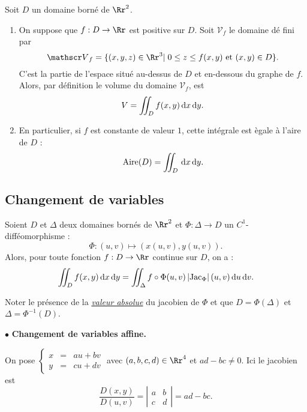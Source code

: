\documentclass[class=report,crop=false]{standalone}
\begin{document}
\vskip6mm

Soit $D$ un domaine borné de $\Rr^2$.
\begin{enumerate}
\item On suppose que $f:D\to \Rr$ est positive sur $D$. Soit ${\mathscr V}_f$ le domaine dé fini par
$${\mathscr V}_f=\{(x,y,z)\in \Rr^3|\; 0\leq z\leq f(x,y)\mbox{ et }(x,y)\in D\}.$$
C'est la partie de l'espace situé au-dessus de $D$ et en-dessous du graphe de $f$. Alors, par définition le volume du domaine ${\mathscr V}_f$, est
$$V=\int \!\!\!\!\int _Df(x,y)\,\mathrm{d} x\,\mathrm{d} y.$$
\item En particulier, si $f$ est constante de valeur $1$, cette intégrale est ègale à l'aire de $D$ :
$${\rm Aire}(D)=\int \!\!\!\!\int _D\,\mathrm{d} x\,\mathrm{d} y.$$
\end{enumerate}

\vskip8mm

\subsection{Changement de variables}

\vskip4mm

\begin{theoreme}Soient $D$ et $\Delta$ deux domaines bornés de $\Rr^2$ et $\Phi :\Delta \to D$ un $C^1$-difféomorphisme :
$$\Phi :(u,v)\mapsto (x(u,v),y(u,v)).$$
Alors, pour toute fonction $f:D\to \Rr$ continue sur $D$, on a :
$$\int \!\!\!\!\int _{D}f(x,y)\d x\d y=\int \!\!\!\!\int _{\Delta}f\circ \Phi (u,v)\left|\jac _{\Phi}\right|(u,v)\d u\d v.$$
\end{theoreme}

\vskip4mm

\noindent Noter le présence de la \underline{\it valeur absolue} du jacobien de $\Phi$ et que $D=\Phi (\Delta )$ et $\Delta =\Phi ^{-1}(D)$.

\vskip6mm

\noindent $\bullet $ {\bf Changement de variables affine.}

\vskip4mm

\noindent On pose $\left\{\begin{array}{ccc}x&=&au+bv\\y&=&cu+dv\end{array}\right.$ avec $(a,b,c,d)\in \Rr^4$ et $ad-bc\neq 0$. Ici le jacobien est
$$\frac{D(x,y)}{D(u,v)}=\left|\begin{array}{cc}a&b \\ c&d\end{array}\right|=ad-bc.$$
\end{document}
